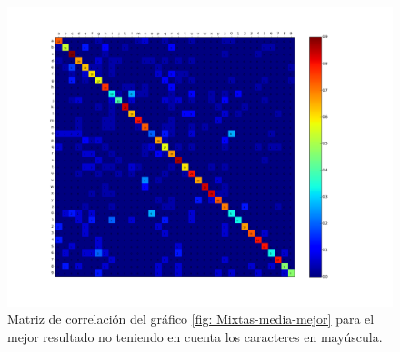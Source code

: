 			\begin{figure}[!htbp]
				\centerline{\includegraphics[scale=0.4]{img/resultados/mixtas/best_mean_matrix_Alpha0,01_2040-4_ins.png}}
				\caption[Matriz de correlación ``case insensitive'' para mixtas media]{Matriz de correlación del gráfico \ref{fig: Mixtas-media-mejor} para el mejor resultado no teniendo en cuenta los caracteres en mayúscula.}
				\label{fig: MatrizIns-Mixtas-media-mejor}
			\end{figure}

